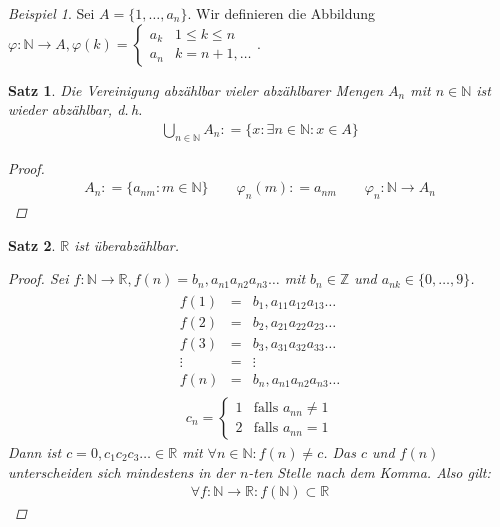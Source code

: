 \documentclass[ngerman,titlepage,twoside, parskip=half*]{scrreprt}
\newcommand*{\N}{\mathbb{N}}
\newcommand*{\Z}{\mathbb{Z}}
\newcommand*{\R}{\mathbb{R}}
\theoremstyle{plain}
\newtheorem{theorem}{Satz}[section]
\theoremstyle{definition}
\theoremstyle{remark}
\newtheorem*{beispiel}{Beispiel}
\newcommand*{\coloneqq}{\mathrel{\mathop:}=}
\begin{document}
\begin{beispiel}
  Sei $A=\{1,\ldots ,a_n\}$. Wir definieren die Abbildung $\varphi \colon \N
  \rightarrow A, \varphi (k) =
    \begin{cases}
      a_k &  1 \leq k \leq n\\
      a_n &  k=n+1,\ldots
    \end{cases}$.
\end{beispiel}

\begin{theorem}
  Die Vereinigung abzählbar vieler abzählbarer Mengen $A_n$ mit $n \in \N$
  ist wieder abzählbar, d.\,h.
  \begin{gather*}\bigcup_{n \in \N} A_n \coloneqq \{x \colon \exists n \in \N \colon x \in
  A\}\end{gather*}
\begin{proof}
  \begin{gather*}A_n \coloneqq\{a_{nm}\colon m\in \N\} \qquad \varphi_n(m)\coloneqq a_{nm} \qquad
  \varphi_n\colon\N \rightarrow A_n\end{gather*}
\end{proof}
\end{theorem}

\begin{theorem}
  $\R$ ist überabzählbar.
\begin{proof}
  Sei $f\colon\N \rightarrow \R, f(n) = b_n,a_{n1}a_{n2}a_{n3}\ldots$ mit
  $b_n \in \Z$ und  $a_{nk} \in \{0,\ldots ,9\}$.
\begin{gather*}\begin{array}{ccc}
  f(1) & = & b_{1},a_{11}a_{12}a_{13}\ldots\\
  f(2) & = & b_{2},a_{21}a_{22}a_{23}\ldots\\
  f(3) & = & b_{3},a_{31}a_{32}a_{33}\ldots\\
  \vdots & = & \vdots \\
  f(n) & = & b_{n},a_{n1}a_{n2}a_{n3}\ldots
\end{array}\end{gather*}
\begin{gather*}c_n =
\begin{cases}
  1 & \text{falls } a_{nn} \neq 1\\
  2 & \text{falls } a_{nn} = 1
\end{cases}\end{gather*}
Dann ist $c=0,c_{1}c_{2}c_{3}\ldots \in \R$ mit $\forall n \in \N\colon
f(n) \neq c$. Das
$c$ und $f(n)$ unterscheiden sich mindestens in der $n$-ten Stelle
nach dem Komma. Also gilt:
\begin{gather*}\forall f\colon \N \rightarrow \R \colon f(\N) \subset \R\end{gather*}
\end{proof}
\end{theorem}
\end{document}
